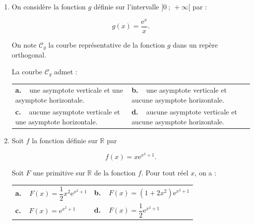 \documentclass[10pt]{article}
\providecommand{\R}{\mathbb{R}}
\providecommand{\e}{{\mathrm{e}}}
\begin{document}
\begin{enumerate}[resume]
\item On considère la fonction $g$ définie sur l'intervalle $]0~;~+\infty[$ par : 

\[g(x) = \dfrac{\e^x}{x}.\]

On note $\mathcal{C}_g$ la courbe représentative de la fonction $g$ dans un repère orthogonal.

La courbe $\mathcal{C}_g$ admet :

\begin{center}
\begin{tabularx}{\linewidth}{X X}
\textbf{a.~~}une asymptote verticale
et une asymptote horizontale.&\textbf{b.~~}une asymptote verticale
et aucune asymptote horizontale.\\
\textbf{c.~~}aucune asymptote verticale et une asymptote horizontale.&\textbf{d.~~}aucune asymptote verticale et aucune asymptote horizontale.
\end{tabularx}
\end{center}
\item Soit $f$ la fonction définie sur $\R$ par

\[f(x) = x\e^{x^2+1}.\]

Soit $F$ une primitive sur $\R$ de la fonction $f$. Pour tout réel $x$, on a :

\begin{center}
\begin{tabularx}{\linewidth}{X X}
\textbf{a.~~}$F(x) = \dfrac12x^2\e^{x^2+1}$ 	& \textbf{b.~~}$F(x) = \left(1 + 2x^2 \right)\e^{x^2+1}$ \\
\textbf{c.~~}$F(x) = \e^{x^2+1}$				& \textbf{d.~~}$F(x) = \dfrac12\e^{x^2+1}$
\end{tabularx}
\end{center}
\end{enumerate}
\end{document}
